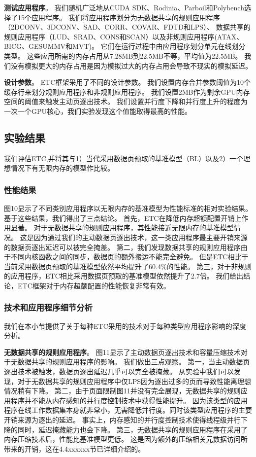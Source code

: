\textbf{测试应用程序}。
我们随机广泛地从CUDA SDK、Rodinia、Parboil和Polybench选择了15个应用程序。
我们将应用程序划分为无数据共享的规则应用程序（2DCONV、3DCONV、SAD、CORR、COVAR、FDTD和LPS）、
数据共享的规则应用程序（LUD、SRAD、CONS和SCAN）以及非规则应用程序(ATAX、BICG、GESUMMV和MVT)。
它们在运行过程中由应用程序划分单元在线划分类型。
这些应用所需的内存占用从7.28MB到22.5MB不等，平均值为22.5MB。
我们没有模拟更大的内存占用是因为模拟过大的内存占用会导致不现实的模拟延迟。

\textbf{设计参数}。
ETC框架采用了不同的设计参数。
我们设置内存合并参数阈值为10个缓存行来划分规则应用程序和非规则应用程序。
我们设置2MB作为剩余GPU内存空间的阈值来触发主动页逐出技术。
我们设置并行度下降和并行度上升的程度为一次一个GPU核心，我们实验发现这个值能取得最高的性能。


\subsection{实验结果}
我们评估ETC,并将其与1）当代采用数据页预取的基准模型（BL）以及2）一个理想情况下有无限内存的模型作比较。

\subsubsection{性能结果}

图10显示了不同类别应用程序以无限内存的基准模型为性能标准的相对实验结果。
基于这些结果，我们得出了三点结论。
首先，ETC在降低内存超额配置开销上作用显著。
对于无数据共享的规则应用程序，其性能接近无限内存的基准模型情况。
这是因为通过我们的主动数据页逐出技术，这一类应用程序最主要开销来源的数据页逐出延迟可以被完全掩盖。
第二，我们发现数据共享的规则应用程序由于不同内核函数之间的同步，数据页的额外搬运不能完全避免。
但是ETC相比于当前采用数据页预取的基准模型依然平均提升了60.4\%的性能。
第三，对于非规则的应用程序，ETC相比采用数据页预取的基准模型依然提升了2.7倍。
我们给出结论，ETC框架对于内存超额配置的性能恢复非常有效。

\subsubsection{技术和应用程序细节分析}

我们在本小节提供了关于每种ETC采用的技术对于每种类型应用程序影响的深度分析。

\textbf{无数据共享的规则应用程序}。
图11显示了主动数据页逐出技术和容量压缩技术对于无数据共享的规则应用程序的影响。
我们做出三点观察。
第一，当主动数据页逐出技术被触发，数据页逐出延迟几乎可以完全被掩藏。
从实验中我们可以发现，对于无数据共享的规则应用程序中仅LPS因为逐出过多的页而导致性能离理想情况稍有下降。
第二，由于页面限制图11并没有完全展现，无数据共享的规则应用程序并不能从内存感知的并行度控制技术中获得性能提升。
因为该类型的应用程序在线工作数据集本身就非常小，无需降低并行度。同时该类型应用程序的主要开销来源为逐出的延迟。
事实上，内存感知的并行度控制技术使得线程级并行下降的同时，延迟掩藏能力也会下降。
第三，无数据共享的规则应用程序在采用了内存压缩技术后，性能比基准模型更低。
这是因为额外的压缩相关元数据访问所带来的开销，这在4.4xxxxxx节已详细介绍的。

